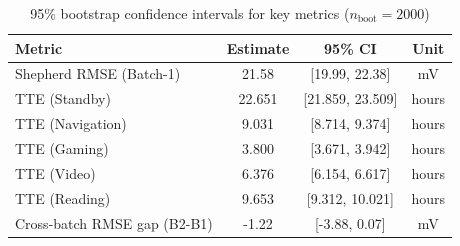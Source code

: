 \begin{table}[htbp]
\centering
\caption{95\% bootstrap confidence intervals for key metrics ($n_{\text{boot}}=2000$)}
\label{tab:bootstrap_ci}
\begin{tabular}{lccc}
\hline
Metric & Estimate & 95\% CI & Unit \\
\hline
Shepherd RMSE (Batch-1) & 21.58 & [19.99, 22.38] & mV \\
TTE (Standby) & 22.651 & [21.859, 23.509] & hours \\
TTE (Navigation) & 9.031 & [8.714, 9.374] & hours \\
TTE (Gaming) & 3.800 & [3.671, 3.942] & hours \\
TTE (Video) & 6.376 & [6.154, 6.617] & hours \\
TTE (Reading) & 9.653 & [9.312, 10.021] & hours \\
Cross-batch RMSE gap (B2-B1) & -1.22 & [-3.88, 0.07] & mV \\
\hline
\end{tabular}
\end{table}
